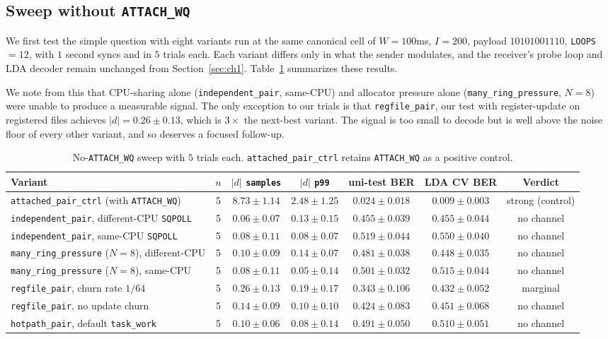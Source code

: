 \documentclass[letterpaper,twocolumn,10pt]{article}
\newcommand{\code}[1]{\texttt{#1}}
\begin{document}
\subsection{Sweep without \code{ATTACH\_WQ}}
We first test the simple question with eight variants run at the same canonical cell of $W = 100$ms, $I = 200$, payload $10101001110$, \code{LOOPS}$=12$, with $1$ second syncs and in $5$ trials each. Each variant differs only in what the sender modulates, and the receiver's probe loop and LDA decoder remain unchanged from Section~\ref{sec:ch1}. Table~\ref{tab:trackB} summarizes these results.

We note from this that CPU-sharing alone (\code{independent\_pair}, same-CPU) and allocator pressure alone (\code{many\_ring\_pressure}, $N = 8$) were unable to produce a measurable signal. The only exception to our trials is that \code{regfile\_pair}, our test with register-update on registered files achieves $|d| = 0.26 \pm 0.13$, which is $3\times$ the next-best variant. The signal is too small to decode but is well above the noise floor of every other variant, and so deserves a focused follow-up.

\begin{table}[t]
\centering\footnotesize
\caption{No-\code{ATTACH\_WQ} sweep with $5$ trials each. \code{attached\_pair\_ctrl} retains \code{ATTACH\_WQ} as a positive control.} 
\label{tab:trackB}
\begin{tabular}{lcccccc}
\toprule
Variant & $n$ & $|d|$ \code{samples} & $|d|$ \code{p99} & uni-test BER & LDA CV BER & Verdict \\
\midrule
\code{attached\_pair\_ctrl} (with \code{ATTACH\_WQ}) & 5 & $8.73 \pm 1.14$ & $2.48 \pm 1.25$ & $0.024 \pm 0.018$ & $0.009 \pm 0.003$ & strong (control) \\
\code{independent\_pair}, different-CPU \code{SQPOLL} & 5 & $0.06 \pm 0.07$ & $0.13 \pm 0.15$ & $0.455 \pm 0.039$ & $0.455 \pm 0.044$ & no channel \\
\code{independent\_pair}, same-CPU \code{SQPOLL} & 5 & $0.08 \pm 0.11$ & $0.08 \pm 0.07$ & $0.519 \pm 0.044$ & $0.550 \pm 0.040$ & no channel \\
\code{many\_ring\_pressure} ($N=8$), different-CPU & 5 & $0.10 \pm 0.09$ & $0.14 \pm 0.07$ & $0.481 \pm 0.038$ & $0.448 \pm 0.035$ & no channel \\
\code{many\_ring\_pressure} ($N=8$), same-CPU & 5 & $0.08 \pm 0.11$ & $0.05 \pm 0.14$ & $0.501 \pm 0.032$ & $0.515 \pm 0.044$ & no channel \\
\code{regfile\_pair}, churn rate $1/64$ & 5 & $\mathbf{0.26 \pm 0.13}$ & $0.19 \pm 0.17$ & $0.343 \pm 0.106$ & $0.432 \pm 0.052$ & marginal \\
\code{regfile\_pair}, no update churn & 5 & $0.14 \pm 0.09$ & $0.10 \pm 0.10$ & $0.424 \pm 0.083$ & $0.451 \pm 0.068$ & no channel \\
\code{hotpath\_pair}, default \code{task\_work} & 5 & $0.10 \pm 0.06$ & $0.08 \pm 0.14$ & $0.491 \pm 0.050$ & $0.510 \pm 0.051$ & no channel \\
\bottomrule
\end{tabular}
\end{table}
\end{document}
